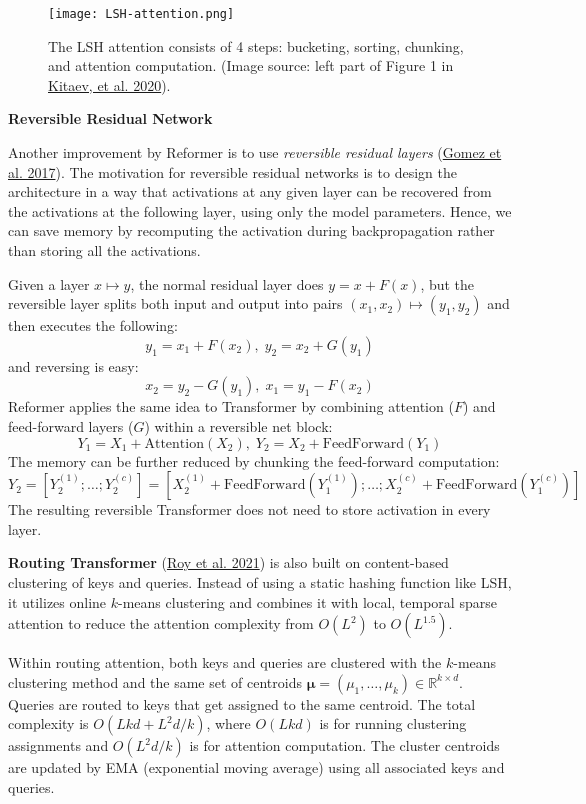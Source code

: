 \documentclass[12pt]{article}
\begin{document}
\begin{figure}[h!]
    \centering
    \texttt{[image: LSH-attention.png]}
    \caption{The LSH attention consists of 4 steps: bucketing, sorting, chunking, and attention computation. (Image source: left part of Figure 1 in \href{https://arxiv.org/abs/2001.04451}{Kitaev, et al. 2020}).}
\end{figure}

\textbf{Reversible Residual Network}

Another improvement by Reformer is to use \emph{reversible residual layers} (\href{https://arxiv.org/abs/1707.04585}{Gomez et al. 2017}). The motivation for reversible residual networks is to design the architecture in a way that activations at any given layer can be recovered from the activations at the following layer, using only the model parameters. Hence, we can save memory by recomputing the activation during backpropagation rather than storing all the activations.

Given a layer $x \mapsto y$, the normal residual layer does $y = x + F(x)$, but the reversible layer splits both input and output into pairs $(x_1, x_2) \mapsto (y_1, y_2)$ and then executes the following:
\[
y_1 = x_1 + F(x_2),\; y_2 = x_2 + G(y_1)
\]
and reversing is easy:
\[
x_2 = y_2 - G(y_1), \; x_1 = y_1 - F(x_2)
\]
Reformer applies the same idea to Transformer by combining attention ($F$) and feed-forward layers ($G$) within a reversible net block:
\[
Y_1 = X_1 + \text{Attention}(X_2), \; Y_2 = X_2 + \text{FeedForward}(Y_1)
\]
The memory can be further reduced by chunking the feed-forward computation:
\[
Y_2 = [Y_2^{(1)}; \dots; Y_2^{(c)}] = [X_2^{(1)} + \text{FeedForward}(Y_1^{(1)}); \dots; X_2^{(c)} + \text{FeedForward}(Y_1^{(c)})]
\]
The resulting reversible Transformer does not need to store activation in every layer.

\textbf{Routing Transformer} (\href{https://arxiv.org/abs/2003.05997}{Roy et al. 2021}) is also built on content-based clustering of keys and queries. Instead of using a static hashing function like LSH, it utilizes online $k$-means clustering and combines it with local, temporal sparse attention to reduce the attention complexity from $O(L^2)$ to $O(L^{1.5})$.

Within routing attention, both keys and queries are clustered with the $k$-means clustering method and the same set of centroids $\boldsymbol{\mu} = (\mu_1, \dots, \mu_k) \in \mathbb{R}^{k \times d}$. Queries are routed to keys that get assigned to the same centroid. The total complexity is $O(Lkd + L^2d/k)$, where $O(Lkd)$ is for running clustering assignments and $O(L^2d/k)$ is for attention computation. The cluster centroids are updated by EMA (exponential moving average) using all associated keys and queries.
\end{document}
